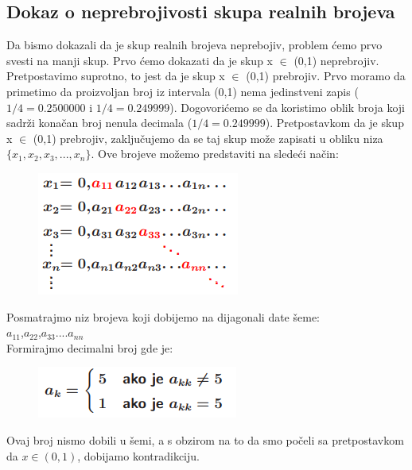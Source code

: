 \documentclass[a4paper]{article}
\begin{document}
\subsection{Dokaz o neprebrojivosti skupa realnih brojeva}
Da bismo dokazali da je skup realnih brojeva neprebojiv, problem ćemo prvo svesti na manji skup. 
Prvo ćemo dokazati da je skup x $\in$ (0,1) neprebrojiv.
\newline
Pretpostavimo suprotno, to jest da je skup x $\in$ (0,1) prebrojiv\cite{matematicka_logika}.
Prvo moramo da primetimo da proizvoljan broj iz intervala (0,1) nema jedinstveni zapis ($1/4=0.2500000$ i $1/4=0.249999$).
Dogovorićemo se da koristimo oblik broja koji sadrži konačan broj nenula decimala ($1/4=0.249999$).
Pretpostavkom da je skup x $\in$ (0,1) prebrojiv, zaključujemo da se taj skup može zapisati u obliku niza $\{x_{1},x_{2},x_{3},...,x_{n}\}$.
\newline
Ove brojeve možemo predstaviti na sledeći način:
 \begin{figure}[ht!]
    \begin{center}
    \includegraphics[scale=1.00]{tnp.png}
    \end{center}
    \end{figure}
\newpage
Posmatrajmo niz brojeva koji dobijemo na dijagonali date šeme:\\

$a_{11}$,$a_{22}$,$a_{33}$....$a_{nn}$\\

Formirajmo decimalni broj gde je:
\begin{figure}[ht!]
    \begin{center}
    \includegraphics[scale=1.30]{tnp2.png}
    \end{center}
    \end{figure}

Ovaj broj nismo dobili u šemi, a s obzirom na to da smo počeli sa pretpostavkom da $x \in (0,1)$, dobijamo kontradikciju.\\
\end{document}
